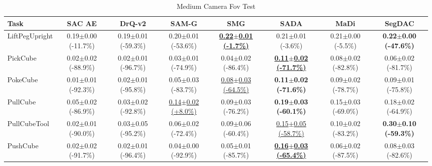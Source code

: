 \begin{table}[htbp]
\centering
\scriptsize
\caption{Medium Camera Fov Test}
\label{tab:appendix_camerafovtest_medium}
\begin{adjustbox}{max width=\textwidth}
\begin{tabular}{l*{7}{c}}
\toprule
\textbf{Task} & \textbf{SAC AE} & \textbf{DrQ-v2} & \textbf{SAM-G} & \textbf{SMG} & \textbf{SADA} & \textbf{MaDi} & \textbf{SegDAC} \\
\midrule
LiftPegUpright & 0.19$\pm$0.00 \scriptsize{(-11.7\%)} & 0.19$\pm$0.01 \scriptsize{(-59.3\%)} & 0.20$\pm$0.01 \scriptsize{(-53.6\%)} & \textbf{\underline{0.22$\pm$0.01 \scriptsize{(-1.7\%)}}} & 0.21$\pm$0.01 \scriptsize{(-3.6\%)} & 0.21$\pm$0.00 \scriptsize{(-5.5\%)} & \textbf{0.22$\pm$0.00 \scriptsize{(-47.6\%)}} \\
PickCube & 0.02$\pm$0.02 \scriptsize{(-88.9\%)} & 0.02$\pm$0.01 \scriptsize{(-96.7\%)} & 0.03$\pm$0.01 \scriptsize{(-74.9\%)} & 0.04$\pm$0.02 \scriptsize{(-86.4\%)} & \textbf{\underline{0.11$\pm$0.02 \scriptsize{(-71.7\%)}}} & 0.08$\pm$0.02 \scriptsize{(-82.8\%)} & 0.06$\pm$0.02 \scriptsize{(-81.7\%)} \\
PokeCube & 0.01$\pm$0.01 \scriptsize{(-92.3\%)} & 0.02$\pm$0.01 \scriptsize{(-95.8\%)} & 0.05$\pm$0.03 \scriptsize{(-83.7\%)} & \underline{0.08$\pm$0.03 \scriptsize{(-64.5\%)}} & \textbf{0.11$\pm$0.02 \scriptsize{(-71.6\%)}} & 0.09$\pm$0.02 \scriptsize{(-78.7\%)} & 0.09$\pm$0.01 \scriptsize{(-75.8\%)} \\
PullCube & 0.05$\pm$0.02 \scriptsize{(-86.9\%)} & 0.03$\pm$0.02 \scriptsize{(-92.8\%)} & \underline{0.14$\pm$0.02 \scriptsize{(+8.0\%)}} & 0.09$\pm$0.03 \scriptsize{(-76.2\%)} & \textbf{0.19$\pm$0.03 \scriptsize{(-60.1\%)}} & 0.15$\pm$0.03 \scriptsize{(-69.0\%)} & 0.18$\pm$0.02 \scriptsize{(-64.9\%)} \\
PullCubeTool & 0.02$\pm$0.01 \scriptsize{(-90.0\%)} & 0.03$\pm$0.05 \scriptsize{(-95.2\%)} & 0.06$\pm$0.02 \scriptsize{(-72.4\%)} & 0.09$\pm$0.06 \scriptsize{(-60.4\%)} & \underline{0.15$\pm$0.05 \scriptsize{(-58.7\%)}} & 0.10$\pm$0.02 \scriptsize{(-83.2\%)} & \textbf{0.30$\pm$0.10 \scriptsize{(-59.3\%)}} \\
PushCube & 0.02$\pm$0.02 \scriptsize{(-91.7\%)} & 0.02$\pm$0.01 \scriptsize{(-96.4\%)} & 0.04$\pm$0.00 \scriptsize{(-92.9\%)} & 0.05$\pm$0.01 \scriptsize{(-85.7\%)} & \textbf{\underline{0.16$\pm$0.03 \scriptsize{(-65.4\%)}}} & 0.06$\pm$0.02 \scriptsize{(-87.5\%)} & 0.08$\pm$0.03 \scriptsize{(-82.6\%)} \\

\end{tabular}
\end{adjustbox}
\end{table}
